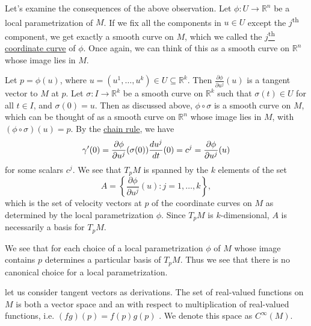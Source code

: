 \documentclass[notoc,notitlepage]{tufte-book}
\begin{document}
Let's examine the consequences of the above observation. Let $\phi : U \to
\mathbb{R}^n$ be a local parametrization of $M$. If we fix all the components in
$u \in U$ except the $j$\textsuperscript{th} component, we get exactly a smooth
curve on $M$, which we called the
\hyperref[defn:_j_th_coordinate_curve]{$j$\textsuperscript{th} coordinate
curve} of $\phi$. Once again, we can think of this as a smooth curve on
$\mathbb{R}^n$ whose image lies in $M$.

Let $p = \phi(u)$, where $u = (u^1, \ldots, u^k) \in U \subseteq \mathbb{R}^k$.
Then $\frac{\partial \phi}{\partial u^j} (u)$ is a tangent vector to $M$ at $p$.
Let $\sigma : I \to \mathbb{R}^k$ be a smooth curve on $\mathbb{R}^k$ such that
$\sigma(t) \in U$ for all $t \in I$, and $\sigma(0) = u$. Then as discussed
above, $\phi \circ \sigma$ is a smooth curve on $M$, which can be thought of as
a smooth curve on $\mathbb{R}^n$ whose image lies in $M$, with $(\phi \circ
\sigma)(u) = p$. By the \hyperref[thm:the_chain_rule]{chain rule}, we have
\begin{equation*}
  \gamma'(0) = \frac{\partial \phi}{\partial u^j} (\sigma(0))
  \frac{\mathop{}\!d{u^j}}{\mathop{}\!d{t}}(0) = c^j = \frac{\partial \phi}{\partial u^j} (u)
\end{equation*}
for some scalars $c^j$. We see that $T_p M$ is spanned by the $k$ elements of
the set
\begin{equation*}
  A = \left\{ \frac{\partial \phi}{\partial u^j}(u) : j = 1, \ldots, k \right\},
\end{equation*}
which is the set of velocity vectors at $p$ of the coordinate curves on $M$ as
determined by the local parametrization $\phi$. Since $T_p M$ is 
$k$-dimensional, $A$ is necessarily a basis for $T_p M$.

We see that for each choice of a local parametrization $\phi$ of $M$ whose image
contains $p$ determines a particular basis of $T_p M$. Thus we see that there is
no canonical choice for a local parametrization.

 let us consider tangent vectors as derivations. The set of
real-valued functions on $M$ is both a vector space and an  with
respect to multiplication of real-valued functions, i.e. $(fg)(p) = f(p)g(p)$
. We denote this space as $C^\infty (M)$.
\end{document}
